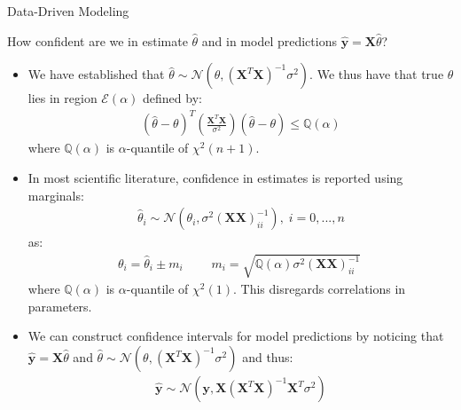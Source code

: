 \documentclass[9pt]{beamer}
\begin{document}
%
\begin{frame}{Data-Driven Modeling}

\begin{block}{}
How confident are we in estimate $\hat{\theta}$ and in model predictions $\hat{\mathbf{y}}=\mathbf{X}\hat{\theta}$?
\end{block}
\begin{itemize}
\item We have established that $\hat{\theta}\sim\mathcal{N}(\theta,(\mathbf{X}^T\mathbf{X})^{-1}\sigma^2)$.  We thus have that true $\theta$ lies in region $\mathcal{E}(\alpha)$ defined by:
\begin{align*}
(\hat{\theta}-\theta)^T\left(\frac{\mathbf{X}^T\mathbf{X}}{\sigma^2}\right)(\hat{\theta}-\theta)\leq \mathbb{Q}(\alpha)
\end{align*}
where $\mathbb{Q}(\alpha)$ is $\alpha$-quantile of $\chi^2(n+1)$.  

\item In most scientific literature, confidence in estimates is reported using marginals:
\begin{align*}
\hat{\theta}_i\sim \mathcal{N}(\theta_i,\sigma^2(\mathbf{X}\mathbf{X})^{-1}_{ii}),\; i=0,...,n
\end{align*}
as:
\begin{align*}
\theta_i=\hat{\theta}_i\pm m_i\;\qquad m_i=\sqrt{\mathbb{Q}(\alpha)\sigma^2(\mathbf{X}\mathbf{X})^{-1}_{ii}}\;
\end{align*}
where  $\mathbb{Q}(\alpha)$ is $\alpha$-quantile of $\chi^2(1)$. This disregards correlations in parameters. 
\item We can construct confidence intervals for model predictions by noticing that $\mathbf{\hat{y}}=\mathbf{X}\hat{\theta}$ and $\hat{\theta}\sim\mathcal{N}(\theta,(\mathbf{X}^T\mathbf{X})^{-1}\sigma^2)$ and thus:
\begin{align*}
\hat{\mathbf{y}}\sim \mathcal{N}(\mathbf{y},\mathbf{X}(\mathbf{X}^T\mathbf{X})^{-1}\mathbf{X}^T\sigma^2)
\end{align*} 
\end{itemize}
\end{frame}
\end{document}
